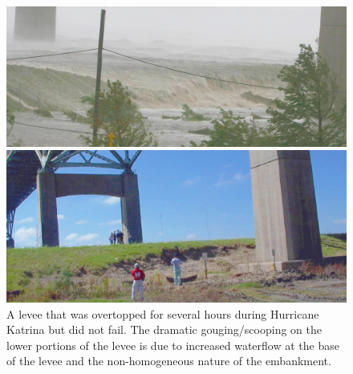 \begin{figure}[t]
  \centering
  \begin{minipage}{0.99\textwidth}
    \includegraphics[width=1.0\textwidth]{images/zimmie_Picture2b_crop.jpg}
  \end{minipage}

  \begin{minipage}{0.99\textwidth}
    \includegraphics[width=1.0\textwidth]{images/zimmie_Picture1b_crop.png}
  \end{minipage}
  \caption[An overtopped levee]{A levee that was overtopped for several hours during
    Hurricane Katrina but did not fail.  The dramatic gouging/scooping
    on the lower portions of the levee is due to increased waterflow at
    the base of the levee and the non-homogeneous nature of the
    embankment.}
  \label{figure:katrina_photos}
\end{figure}



